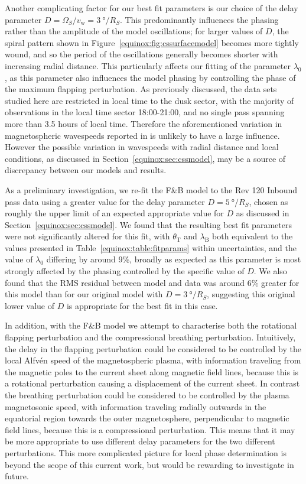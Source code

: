 Another complicating factor for our best fit parameters is our choice of the delay parameter $D = \Omega_S/v_\mathrm{w} = \SI{3}{\degree/R_S}$. This predominantly influences the phasing rather than the amplitude of the model oscillations; for larger values of $D$, the spiral pattern shown in Figure~\ref{equinox:fig:cssurfacemodel} becomes more tightly wound, and so the period of the oscillations generally becomes shorter with increasing radial distance. This particularly affects our fitting of the parameter $\lambda_0$, as this parameter also influences the model phasing by controlling the phase of the maximum flapping perturbation. As previously discussed, the data sets studied here are restricted in local time to the dusk sector, with the majority of observations in the local time sector 18:00{\--}21:00, and no single pass spanning more than 3.5 hours of local time. Therefore the aforementioned variation in magnetospheric wavespeeds reported in \citet{andrews2010} is unlikely to have a large influence. However the possible variation in wavespeeds with radial distance and local conditions, as discussed in Section~\ref{equinox:sec:cssmodel}, may be a source of discrepancy between our models and results. 

As a preliminary investigation, we re-fit the F{\&}B model to the Rev 120 Inbound pass data using a greater value for the delay parameter $D = \SI{5}{\degree/R_S}$, chosen as roughly the upper limit of an expected appropriate value for $D$ as discussed in Section~\ref{equinox:sec:cssmodel}. We found that the resulting best fit parameters were not significantly altered for this fit, with $\theta_\mathrm{T}$ and $\lambda_\mathrm{B}$ both equivalent to the values presented in Table~\ref{equinox:table:fitparams} within uncertainties, and the value of $\lambda_0$ differing by around 9\%, broadly as expected as this parameter is most strongly affected by the phasing controlled by the specific value of $D$. We also found that the RMS residual between model and data was around 6\% greater for this model than for our original model with $D = \SI{3}{\degree/R_S}$, suggesting this original lower value of $D$ is appropriate for the best fit in this case.

In addition, with the F{\&}B model we attempt to characterise both the rotational flapping perturbation and the compressional breathing perturbation. Intuitively, the delay in the flapping perturbation could be considered to be controlled by the local Alfv\'{e}n speed of the magnetospheric plasma, with information traveling from the magnetic poles to the current sheet along magnetic field lines, because this is a rotational perturbation causing a displacement of the current sheet. In contrast the breathing perturbation could be considered to be controlled by the plasma magnetosonic speed, with information traveling radially outwards in the equatorial region towards the outer magnetosphere, perpendicular to magnetic field lines, because this is a compressional perturbation. This means that it may be more appropriate to use different delay parameters for the two different perturbations. This more complicated picture for local phase determination is beyond the scope of this current work, but would be rewarding to investigate in future.

